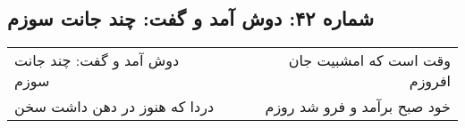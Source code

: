 \begin{center}
\section*{شماره ۴۲: دوش آمد و گفت: چند جانت سوزم}
\label{sec:042}
\begin{longtable}{l p{0.5cm} r}
دوش آمد و گفت: چند جانت سوزم
&&
وقت است که امشبیت جان افروزم
\\
دردا که هنوز در دهن داشت سخن
&&
خود صبح برآمد و فرو شد روزم
\\
\end{longtable}
\end{center}
